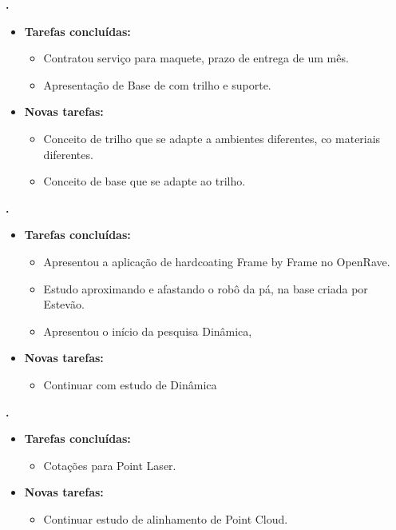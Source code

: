 					
			
   \textbf{.} 
	\begin{itemize}
		\item \textbf{Tarefas concluídas:}
			\begin{itemize}  
			  \item Contratou serviço para maquete, prazo de entrega de um mês.
			  \item Apresentação de Base de com trilho e suporte.
			\end{itemize}
		
		\item \textbf{Novas tarefas:}
			\begin{itemize} 
				\item Conceito de trilho que se adapte a ambientes diferentes, co materiais
				diferentes.
				\item Conceito de base que se adapte ao trilho.
			\end{itemize}
	\end{itemize}

	  \textbf{\renan.} 
	\begin{itemize}
		\item \textbf{Tarefas concluídas:}
			\begin{itemize}    
				\item Apresentou a aplicação de hardcoating Frame by Frame no OpenRave. 
				\item Estudo aproximando e afastando o robô da pá, na base criada por
				Estevão.
				\item Apresentou o início da pesquisa Dinâmica,
			\end{itemize}
		
		\item \textbf{Novas tarefas:}
			\begin{itemize} 
			    \item Continuar com estudo de Dinâmica
			\end{itemize}
	\end{itemize}	
	
	
	  \textbf{\elael.} 
	\begin{itemize}
		\item \textbf{Tarefas concluídas:}
			\begin{itemize}    
				\item Cotações para Point Laser. 
			\end{itemize}
		
		\item \textbf{Novas tarefas:}
			\begin{itemize} 
			    \item Continuar estudo de alinhamento de Point Cloud.
			\end{itemize}
	\end{itemize}			
			
